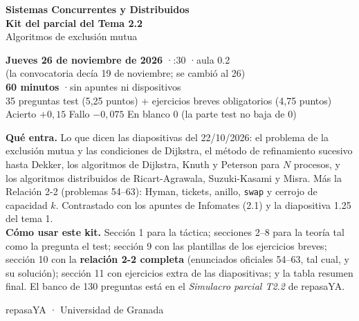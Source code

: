 \documentclass[11pt,a4paper,oneside]{report}
\begin{document}
\begin{titlepage}
  \centering
  \vspace*{1.5cm}
  {\Huge\bfseries\color{scdDarkBlue}\textsf{Sistemas Concurrentes y Distribuidos}}\\[0.6cm]
  {\LARGE\bfseries\color{scdPrimary}\textsf{Kit del parcial del Tema 2.2}}\\[0.3cm]
  {\Large\textsf{Algoritmos de exclusión mutua}}\\[1.2cm]
  \begin{tcolorbox}[colback=scdLightAccent,colframe=scdAccent,arc=4pt,width=0.86\textwidth]
    \centering\large
    \textbf{Jueves 26 de noviembre de 2026} \quad·:30 \quad·\quad aula 0.2\\[2pt]
    {\normalsize (la convocatoria decía 19 de noviembre; se cambió al 26)}\\[6pt]
    \textbf{60 minutos} \quad·\quad sin apuntes ni dispositivos\\[6pt]
    35 preguntas test (5,25 puntos) \;+ ejercicios breves obligatorios (4,75 puntos)\\[2pt]
    Acierto $+0{,}15$ \quad Fallo $-0{,}075$ \quad En blanco $0$ \quad (la parte test no baja de 0)
  \end{tcolorbox}
  \vspace{1cm}
  \begin{minipage}{0.86\textwidth}\small
  \textbf{Qué entra.} Lo que dicen las diapositivas del 22/10/2026: el problema de la exclusión mutua y las
  condiciones de Dijkstra, el método de refinamiento sucesivo hasta Dekker, los algoritmos de Dijkstra, Knuth y
  Peterson para $N$ procesos, y los algoritmos distribuidos de Ricart-Agrawala, Suzuki-Kasami y Misra. Más la
  Relación 2-2 (problemas 54–63): Hyman, tickets, anillo, \texttt{swap} y cerrojo de capacidad $k$.
  Contrastado con los apuntes de Infomates (2.1) y la diapositiva 1.25 del tema 1.\\[6pt]
  \textbf{Cómo usar este kit.} Sección 1 para la táctica; secciones 2–8 para la teoría tal como la pregunta el
  test; sección 9 con las plantillas de los ejercicios breves; sección 10 con la \textbf{relación 2-2 completa}
  (enunciados oficiales 54–63, tal cual, y su solución); sección 11 con ejercicios extra de las diapositivas; y
  la tabla resumen final. El banco de 130 preguntas está en el \emph{Simulacro parcial T2.2} de repasaYA.
  \end{minipage}
  \vfill
  {\large\textsf{repasaYA · Universidad de Granada}}
\end{titlepage}
\end{document}
